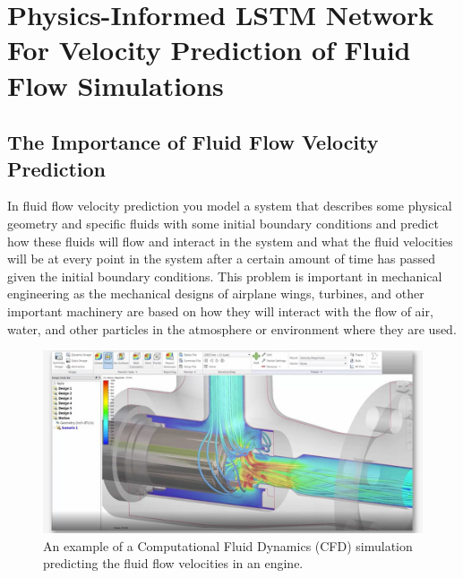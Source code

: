 \chapter{Physics-Informed LSTM Network For Velocity Prediction of Fluid Flow Simulations}
\section{The Importance of Fluid Flow Velocity Prediction}
In fluid flow velocity prediction you model a system that describes some physical geometry and specific fluids with some initial boundary conditions and predict how these fluids will flow and interact in the system and what the fluid velocities will be at every point in the system after a certain amount of time has passed given the initial boundary conditions. This problem is important in mechanical engineering as the mechanical designs of airplane wings, turbines, and other important machinery are based on how they will interact with the flow of air, water, and other particles in the atmosphere or environment where they are used.

\begin{figure}[H] \centering
    \includegraphics[width=\linewidth]{figures/cfd_engine.png}
    \caption{An example of a Computational Fluid Dynamics (CFD) simulation predicting the fluid flow velocities in an engine.}
    \label{fig:cfd_engine}
\end{figure}


